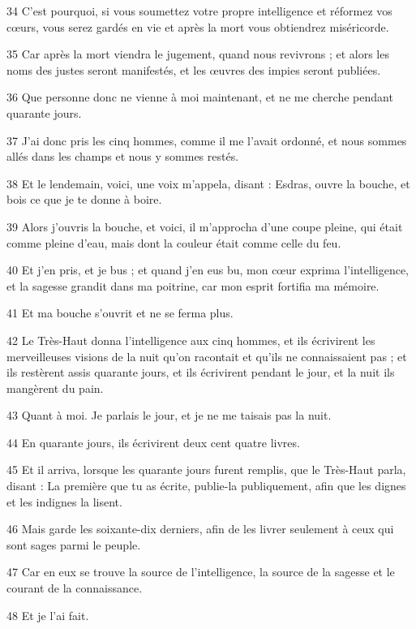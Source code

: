 \par 34 C'est pourquoi, si vous soumettez votre propre intelligence et réformez vos cœurs, vous serez gardés en vie et après la mort vous obtiendrez miséricorde.
\par 35 Car après la mort viendra le jugement, quand nous revivrons ; et alors les noms des justes seront manifestés, et les œuvres des impies seront publiées.
\par 36 Que personne donc ne vienne à moi maintenant, et ne me cherche pendant quarante jours.
\par 37 J'ai donc pris les cinq hommes, comme il me l'avait ordonné, et nous sommes allés dans les champs et nous y sommes restés.
\par 38 Et le lendemain, voici, une voix m'appela, disant : Esdras, ouvre la bouche, et bois ce que je te donne à boire.
\par 39 Alors j'ouvris la bouche, et voici, il m'approcha d'une coupe pleine, qui était comme pleine d'eau, mais dont la couleur était comme celle du feu.
\par 40 Et j'en pris, et je bus ; et quand j'en eus bu, mon cœur exprima l'intelligence, et la sagesse grandit dans ma poitrine, car mon esprit fortifia ma mémoire.
\par 41 Et ma bouche s'ouvrit et ne se ferma plus.
\par 42 Le Très-Haut donna l'intelligence aux cinq hommes, et ils écrivirent les merveilleuses visions de la nuit qu'on racontait et qu'ils ne connaissaient pas ; et ils restèrent assis quarante jours, et ils écrivirent pendant le jour, et la nuit ils mangèrent du pain.
\par 43 Quant à moi. Je parlais le jour, et je ne me taisais pas la nuit.
\par 44 En quarante jours, ils écrivirent deux cent quatre livres.
\par 45 Et il arriva, lorsque les quarante jours furent remplis, que le Très-Haut parla, disant : La première que tu as écrite, publie-la publiquement, afin que les dignes et les indignes la lisent.
\par 46 Mais garde les soixante-dix derniers, afin de les livrer seulement à ceux qui sont sages parmi le peuple.
\par 47 Car en eux se trouve la source de l'intelligence, la source de la sagesse et le courant de la connaissance.
\par 48 Et je l'ai fait.


